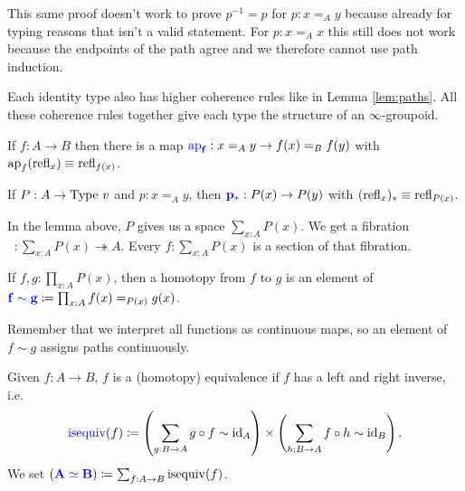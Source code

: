 \begin{rem}
    This same proof doesn't work to prove $p^{-1} = p$ for $p : x \mathrel{=_A} y$ because already for typing reasons that isn't a valid statement.
    For $p : x \mathrel{=_A} x$ this still does not work because the endpoints of the path agree and we therefore cannot use path induction.
\end{rem}

\begin{rem}
    Each identity type also has higher coherence rules like in Lemma \ref{lem:paths}.
    All these coherence rules together give each type the structure of an $\infty$-groupoid.
\end{rem}

\begin{boxlem}
    If $f : A \to B$ then there is a map $\alert{\mathop{\operatorname{ap}_f}} : x \mathrel{=_A} y \to f(x) \mathrel{=_B} f(y)$ with $\mathop{\operatorname{ap}_f}(\operatorname{refl}_{x}) \equiv \operatorname{refl}_{f(x)}$.
\end{boxlem}

\begin{boxlem}
    If $P : A \to \mathrm{Type}\ v$ and $p : x \mathrel{=_A} y$, then $\alert{p_*} : P(x) \to P(y)$ with $(\operatorname{refl}_{x})_* \equiv \operatorname{refl}_{P(x)}$.
\end{boxlem}

\begin{rem}
    In the lemma above, $P$ gives us a space $\sum_{x : A} P(x)$.
    We get a fibration $\mathop{\pi_1} : \sum_{x : A} P(x) \twoheadrightarrow A$.
    Every $f : \sum_{x : A} P(x)$ is a section of that fibration.
\end{rem}

\begin{boxdefi}
    If $f, g : \prod_{x : A} P(x)$, then a \alert{homotopy} from $f$ to $g$ is an element of $\alert{f \sim g} \coloneq \prod_{x : A} f(x) \mathrel{=_{P(x)}} g(x)$.
\end{boxdefi}

\begin{rem}
    Remember that we interpret all functions as continuous maps, so an element of $f \sim g$ assigns paths continuously.
\end{rem}

\begin{boxdefi}
    Given $f : A \to B$, $f$ is a \alert{(homotopy) equivalence} if $f$ has a left and right inverse, i.e.\
    \begin{equation*}
        \alert{\operatorname{isequiv}}(f) \coloneq \left( \sum_{g : B \to A} g \circ f \sim \id_A \right) \times \left( \sum_{h : B \to A} f \circ h \sim \id_B \right).
    \end{equation*}
    We set $(\alert{A \simeq B}) \coloneq \sum_{f : A \to B} \operatorname{isequiv}(f)$.
\end{boxdefi}

